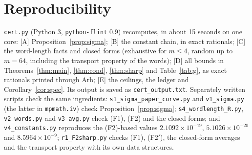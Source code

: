 \documentclass[11pt]{article}
\theoremstyle{definition}
\theoremstyle{remark}
\begin{document}
\section*{Reproducibility}
\texttt{cert.py} (Python 3, \texttt{python-flint} 0.9) recomputes, in about 15 seconds on one core:
[A] Proposition~\ref{prop:sigma}; [B] the constant chain, in exact rationals; [C] the word-length
facts and closed forms (exhaustive for $m\le4$, random up to $m=64$, including the transport
property of the words); [D] all bounds in Theorems~\ref{thm:main}, \ref{thm:cond},
\ref{thm:sharp} and Table~\ref{tab:g}, as exact rationals printed through Arb; [E] the ceilings,
the ledger and Corollary~\ref{cor:spec}. Its output is saved as \texttt{cert\_output.txt}.
Separately written scripts check the same ingredients:
\texttt{s1\_sigma\_paper\_curve.py} and \texttt{v1\_sigma.py} (the latter in \texttt{mpmath.iv}) check
Proposition~\ref{prop:sigma}; \texttt{s4\_wordlength\_R.py}, \texttt{v2\_words.py} and
\texttt{v3\_avg.py} check (F1), (F2) and the closed forms; and \texttt{v4\_constants.py}
reproduces the (F2)-based values $2.1092\times10^{-19}$, $5.1026\times10^{-20}$ and
$8.5964\times10^{-9}$; \texttt{r1\_F2sharp.py} checks (F1), (F2$'$), the closed-form averages and the
transport property with its own data structures.
\end{document}
